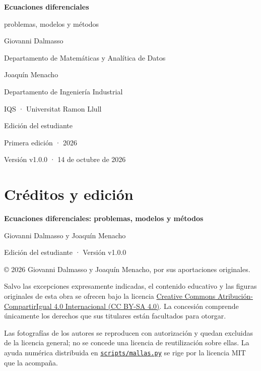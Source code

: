 \begin{titlepage}
\vspace*{20mm}
{\Huge\sffamily\bfseries\color{ink}Ecuaciones diferenciales\par}
\vspace{5mm}
{\LARGE problemas, modelos y métodos\par}
\vspace{18mm}
{\Large Giovanni Dalmasso\par}
{\small Departamento de Matemáticas y Analítica de Datos\par}
\vspace{7mm}
{\Large Joaquín Menacho\par}
{\small Departamento de Ingeniería Industrial\par}
\vspace{9mm}
{\normalsize IQS · Universitat Ramon Llull\par}
\vfill
{\large Edición del estudiante\par}
Primera edición · 2026\par
{\small Versión v1.0.0 · 14 de octubre de 2026\par}
\end{titlepage}
\chapter*{Créditos y edición}
\thispagestyle{plain}
\textbf{Ecuaciones diferenciales: problemas, modelos y métodos}\par
Giovanni Dalmasso y Joaquín Menacho\par
Edición del estudiante · Versión v1.0.0

© 2026 Giovanni Dalmasso y Joaquín Menacho, por sus aportaciones originales.

Salvo las excepciones expresamente indicadas, el contenido educativo y las figuras originales de esta obra se ofrecen bajo la licencia \href{https://creativecommons.org/licenses/by-sa/4.0/legalcode.es}{Creative Commons Atribución-CompartirIgual 4.0 Internacional (CC BY-SA 4.0)}. La concesión comprende únicamente los derechos que sus titulares están facultados para otorgar.

Las fotografías de los autores se reproducen con autorización y quedan excluidas de la licencia general; no se concede una licencia de reutilización sobre ellas. La ayuda numérica distribuida en \href{https://github.com/gioda/ecuaciones-diferenciales/blob/main/scripts/mallas.py}{\texttt{scripts/mallas.py}} se rige por la licencia MIT que la acompaña.

